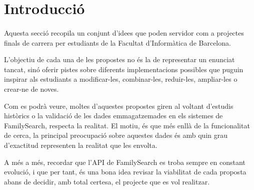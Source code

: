 \section{Introducció}

    \paragraph{}
    Aquesta secció recopila un conjunt d'idees que poden servidor com a projectes finals de carrera per estudiants de la Facultat d'Informàtica de Barcelona.

    L'objectiu de cada una de les propostes no és la de representar un enunciat tancat, sinó oferir pistes sobre diferents implementacions possibles que puguin inspirar als estudiants a modificar-les, combinar-les, reduir-les, ampliar-les o crear-ne de noves.

    Com es podrà veure, moltes d'aquestes propostes giren al voltant d'estudis històrics o la validació de les dades emmagatzemades en els sistemes de FamilySearch, respecta la realitat. El motiu, és que més enllà de la funcionalitat de cerca, la principal preocupació sobre aquestes dades és amb quin grau d'exactitud representen la realitat que les envolta.

    A més a més, recordar que l'API de FamilySearch es troba sempre en constant evolució, i que per tant, és una bona idea revisar la viabilitat de cada proposta abans de decidir, amb total certesa, el projecte que es vol realitzar.
